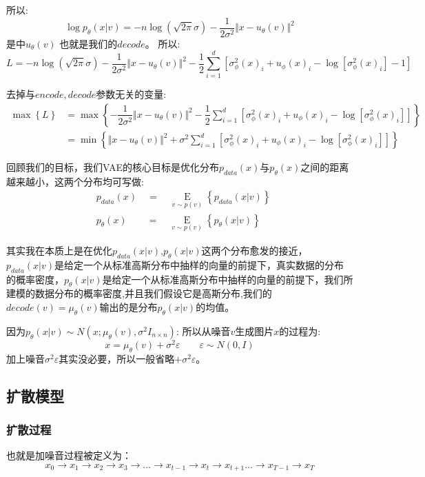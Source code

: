 \documentclass[withoutpreface,bwprint]{cumcmthesis} %
\begin{document}
	所以:
	$$
		\log p_{\theta}(x|v) = - n \log \left( \sqrt{2\pi}\sigma \right)  - \dfrac{1}{2  \sigma^2} \Vert x-u_{\theta}(v)  \Vert^2
	$$
	是中$u_{\theta}(v)$ 也就是我们的$decode$。
	所以:
	$$
		L= - n \log \left( \sqrt{2\pi}\sigma \right)  - \dfrac{1}{2  \sigma^2} \Vert x-u_{\theta}(v)  \Vert^2 - \dfrac{1}{2} \sum_{i=1}^{d} \left[  \sigma^2_{\phi}(x)_i +  u_{\phi}(x)_i  - \log \left[ \sigma^2_{\phi}(x)_i \right] -1 \right]
	$$
	
	去掉与$encode,decode$参数无关的变量:
	\begin{align*}
			\mathop{max} \left\{ L \right\} & = \mathop{max} \left\{ - \dfrac{1}{2  \sigma^2} \Vert x-u_{\theta}(v)  \Vert^2  -   \dfrac{1}{2} \sum_{i=1}^{d} \left[  \sigma^2_{\phi}(x)_i +  u_{\phi}(x)_i  - \log \left[ \sigma^2_{\phi}(x)_i \right]  \right] \right\} \\
			& = \mathop{min} \left\{ \Vert x-u_{\theta}(v)  \Vert^2  +  \sigma^2 \sum_{i=1}^{d} \left[  \sigma^2_{\phi}(x)_i +  u_{\phi}(x)_i  - \log \left[ \sigma^2_{\phi}(x)_i \right]  \right]  \right\}
	\end{align*}	
	
	回顾我们的目标，我们VAE的核心目标是优化分布$p_{data}(x)$与$p_{\theta}(x)$之间的距离越来越小，这两个分布均可写做:
	\begin{align*}
		& p_{data}(x) \quad = \quad \mathop{E}\limits_{v \sim p(v)} \left\{ p_{data}(x|v) \right\} \\
		& p_{\theta}(x)\quad \quad  = \quad \mathop{E}\limits_{v \sim p(v)}  \left\{ p_{\theta}(x|v) \right\} 
	\end{align*}
	
	其实我在本质上是在优化$p_{data}(x|v)$,$p_{\theta}(x|v)$这两个分布愈发的接近，$p_{data}(x|v)$是给定一个从标准高斯分布中抽样的向量的前提下，真实数据的分布的概率密度，$p_{\theta}(x|v)$是给定一个从标准高斯分布中抽样的向量的前提下，我们所建模的数据分布的概率密度,并且我们假设它是高斯分布,我们的$decode(v)=\mu_{\theta}(v)$输出的是分布$p_{\theta}(x|v)$的均值。
	
	因为$p_{\theta}(x|v) \sim N(x;\mu_{\theta}(v),\sigma^2 I_{n \times n})$:
	所以从噪音$v$生成图片$x$的过程为:
	$$
		x=\mu_{\theta}(v) + \sigma^2 \varepsilon \quad \quad \varepsilon \sim N(0,I)
	$$
	加上噪音$ \sigma^2 \varepsilon$其实没必要，所以一般省略$ + \sigma^2 \varepsilon$。
	\subsection{\Large 扩散模型}
	\subsubsection{\large 扩散过程}
	也就是加噪音过程被定义为：
	$$
		x_0 \longrightarrow x_1 \longrightarrow x_2 \longrightarrow x_3 \longrightarrow \ldots \longrightarrow x_{t-1} \longrightarrow x_{t} \longrightarrow x_{t+1} \ldots \longrightarrow x_{T-1} \longrightarrow x_{T}
	$$
	
\end{document}
